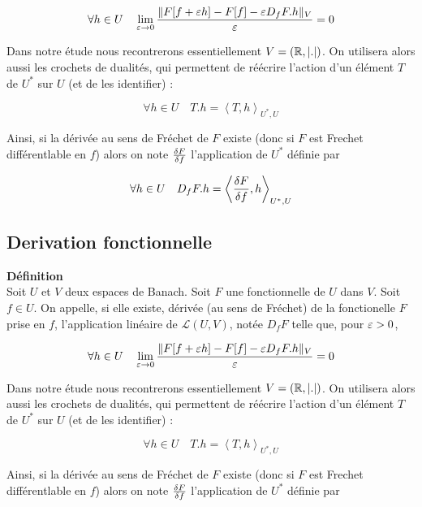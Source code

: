 \documentclass[10pt]{article}
\begin{document}
\begin{multicols}{2}
\begin{equation}
\forall h \in U \quad \lim_{ \varepsilon \rightarrow 0 } \frac{\| F[f+\varepsilon h] - F[f] - \varepsilon D_fF.h\|_V}{\varepsilon}  = 0
\end{equation} 


Dans notre étude nous recontrerons essentiellement $V = (\mathbb{R}, |.|)$. On utilisera alors aussi les crochets de dualités, qui permettent de réécrire l'action d'un élément $T$ de $U^*$ sur $U$ (et de les identifier) : 

\begin{equation}
  \forall h \in U \quad T.h = \left< T, h \right>_{U^*, U}
\end{equation}

Ainsi, si la dérivée au sens de Fréchet de $F$ existe (donc si $F$ est Frechet différentlable en $f$) alors on note $\frac{\delta F}{\delta f}$ l'application de $U^*$ définie par 

\begin{equation}
  \forall h \in U \quad D_fF.h = \left< \frac{\delta F}{\delta f}, h \right>_{U^*, U}
\end{equation}

\vspace*{11pt}
\subsection{Derivation fonctionnelle}


\textbf{Définition}\\
Soit $U$ et $V$ deux espaces de Banach. Soit $F$ une fonctionnelle de $U$ dans $V$. 
Soit $f \in U$. On appelle, si elle existe, dérivée (au sens de Fréchet) de la fonctionelle $F$ prise en $f$, l'application linéaire de $\mathcal{L}(U,V)$, notée $D_fF$ telle que, pour $\varepsilon>0$, 

\begin{equation}
\forall h \in U \quad \lim_{ \varepsilon \rightarrow 0 } \frac{\| F[f+\varepsilon h] - F[f] - \varepsilon D_fF.h\|_V}{\varepsilon}  = 0
\end{equation} 


Dans notre étude nous recontrerons essentiellement $V = (\mathbb{R}, |.|)$. On utilisera alors aussi les crochets de dualités, qui permettent de réécrire l'action d'un élément $T$ de $U^*$ sur $U$ (et de les identifier) : 

\begin{equation}
  \forall h \in U \quad T.h = \left< T, h \right>_{U^*, U}
\end{equation}

Ainsi, si la dérivée au sens de Fréchet de $F$ existe (donc si $F$ est Frechet différentlable en $f$) alors on note $\frac{\delta F}{\delta f}$ l'application de $U^*$ définie par 


\end{multicols}
\end{document}
